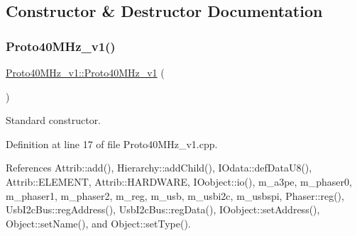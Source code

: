 \subsection{Constructor \& Destructor Documentation}
\mbox{\label{classProto40MHz__v1_ac78306552cc5dcff551d03cda7a12c0f}} 
\subsubsection{\texorpdfstring{Proto40\+M\+Hz\+\_\+v1()}{Proto40MHz\_v1()}}
{\footnotesize\ttfamily \hyperlink{classProto40MHz__v1_1_1Proto40MHz__v1}{Proto40\+M\+Hz\+\_\+v1\+::\+Proto40\+M\+Hz\+\_\+v1} (\begin{DoxyParamCaption}{ }\end{DoxyParamCaption})}



Standard constructor. 



Definition at line 17 of file Proto40\+M\+Hz\+\_\+v1.\+cpp.



References Attrib\+::add(), Hierarchy\+::add\+Child(), I\+Odata\+::def\+Data\+U8(), Attrib\+::\+E\+L\+E\+M\+E\+NT, Attrib\+::\+H\+A\+R\+D\+W\+A\+RE, I\+Oobject\+::io(), m\+\_\+a3pe, m\+\_\+phaser0, m\+\_\+phaser1, m\+\_\+phaser2, m\+\_\+reg, m\+\_\+usb, m\+\_\+usbi2c, m\+\_\+usbspi, Phaser\+::reg(), Usb\+I2c\+Bus\+::reg\+Address(), Usb\+I2c\+Bus\+::reg\+Data(), I\+Oobject\+::set\+Address(), Object\+::set\+Name(), and Object\+::set\+Type().


